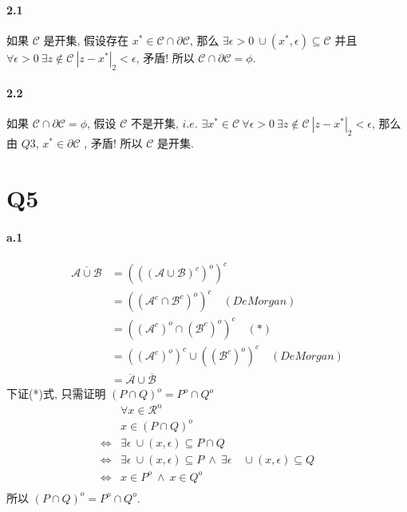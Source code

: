 \documentclass{article}
\begin{document}
\begin{CJK}{UTF8}{gbsn}
  \paragraph{2.1} 如果 $\mathcal{C}$ 是开集, 假设存在 $x^* \in \mathcal{C} \cap \partial \mathcal{C}$, 那么 $\exists \epsilon > 0\ \cup(x^*, \epsilon) \subseteq \mathcal{C}$ 并且 $\forall \epsilon > 0\ \exists z \not\in \mathcal{C}\ |z - x^*|_2 < \epsilon$, 矛盾! 所以 $\mathcal{C} \cap \partial \mathcal{C} = \phi$.
  \paragraph{2.2} 如果 $\mathcal{C} \cap \partial \mathcal{C} = \phi$, 假设 $\mathcal{C}$ 不是开集, $i.e.$ $\exists x^* \in \mathcal{C}\  \forall \epsilon > 0\ \exists z \not\in \mathcal{C}\ |z - x^*|_2 < \epsilon$, 那么由 $Q3$, $x^* \in \partial \mathcal{C}$
  , 矛盾! 所以 $\mathcal{C}$ 是开集.

\section{Q5}
  \paragraph{a.1}
    \begin{equation}
      \begin{aligned}
        \overline{\mathcal{A} \cup \mathcal{B}} & = (((\mathcal{A} \cup \mathcal{B})^c)^o)^c \\
        & = ((\mathcal{A}^c \cap \mathcal{B}^c)^o)^c \quad (De Morgan) \\
        & = ((\mathcal{A}^c)^o \cap (\mathcal{B}^c)^o)^c \quad (*) \\
        & = ((\mathcal{A}^c)^o)^c \cup ((\mathcal{B}^c)^o)^c \quad (De Morgan) \\
        & = \overline{\mathcal{A}} \cup \overline{\mathcal{B}}
      \end{aligned}
    \end{equation}
    下证(*)式, 只需证明 $(P \cap Q)^o = P^o \cap Q^o$
    \begin{equation}
      \begin{aligned}
        & \forall x \in \mathcal{R}^n \\
        & x \in (P \cap Q)^o \\
        \iff & \exists \epsilon \ \cup (x, \epsilon) \subseteq P \cap Q \\
        \iff & \exists \epsilon \ \cup (x, \epsilon) \subseteq P \ \land\  \exists \epsilon \quad \cup (x, \epsilon) \subseteq Q \\
        \iff & x \in P^o \ \land\  x \in Q^o \\
      \end{aligned}
    \end{equation}
    所以 $(P \cap Q)^o = P^o \cap Q^o$.

\end{CJK}
\end{document}
